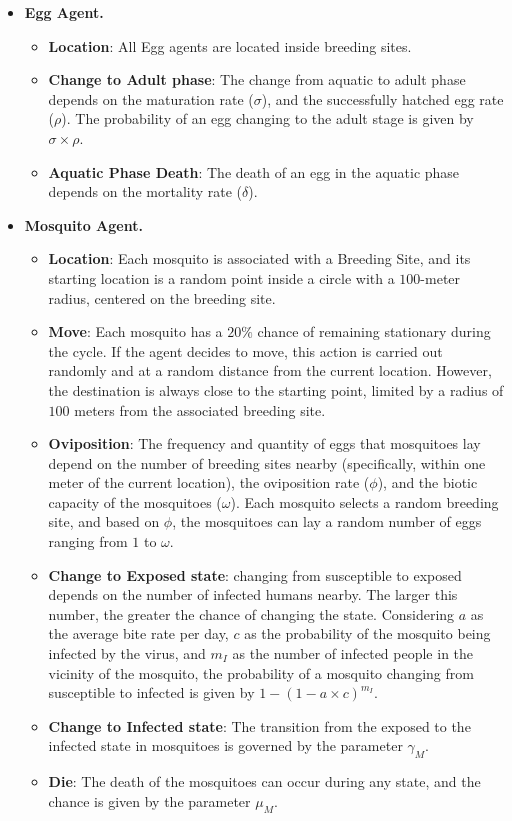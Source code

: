 \begin{itemize}
\item \textbf{Egg Agent.}
\begin{itemize}
    \item \textbf{Location}: All Egg agents are located inside breeding sites.
    \item \textbf{Change to  Adult phase}: The change from aquatic to adult phase depends on the maturation rate ($\sigma$), and the successfully hatched egg rate ($\rho$). The probability of an egg changing to the adult stage is given by $\sigma \times \rho$.
    \item \textbf{Aquatic Phase Death}: The death of an egg in the aquatic phase depends on the mortality rate ($\delta$).
\end{itemize}

\item \textbf{Mosquito Agent.}
  \begin{itemize}
    \item \textbf{Location}: Each mosquito is associated with a Breeding Site, and its starting location is a random point inside a circle with a $100$-meter radius, centered on the breeding site.
    \item \textbf{Move}: Each mosquito has a $20\%$ chance of remaining stationary during the cycle. If the agent decides to move, this action is carried out randomly and at a random distance from the current location. However, the destination is always close to the starting point, limited by a radius of $100$ meters from the associated breeding site.
    
    \item  \textbf{Oviposition}: The frequency and quantity of eggs that mosquitoes lay depend on the number of breeding sites nearby (specifically, within one meter of the current location), the oviposition rate ($\phi$), and the biotic capacity of the mosquitoes ($\omega$). Each mosquito selects a random breeding site, and based on $\phi$, the mosquitoes can lay a random number of eggs ranging from $1$ to $\omega$.
    
    \item \textbf{Change to Exposed state}: changing from susceptible to exposed depends on the number of infected humans nearby. The larger this number, the greater the chance of changing the state. Considering $a$ as the average bite rate per day, $c$ as the probability of the mosquito being infected by the virus, and $m_I$ as the number of infected people in the vicinity of the mosquito, the probability of a mosquito changing from susceptible to infected is given by $1 - (1 - a \times c)^{m_I}$.
    \item \textbf{Change to  Infected state}: The transition from the exposed to the infected state in mosquitoes is governed by the parameter $\gamma_M$.
    \item \textbf{Die}: The death of the mosquitoes can occur during any state, and the chance is given by the parameter $\mu_M$.
  \end{itemize}
\end{itemize}

